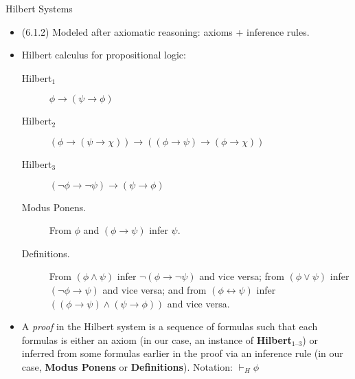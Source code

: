 \documentclass[../slides.tex]{subfiles}
\begin{document}
\begin{frame}{Hilbert Systems}

	\begin{itemize}
	
		\item (6.1.2) Modeled after axiomatic reasoning: axioms + inference rules.
	
		\item Hilbert calculus for propositional logic:
		
		 \begin{description}

						\item[Hilbert$_1$] $\phi\to (\psi\to \phi)$

						\item[Hilbert$_2$] $(\phi\to (\psi\to \chi))\to((\phi\to \psi)\to (\phi\to \chi))$

						\item[Hilbert$_3$] $(\neg \phi\to \neg \psi)\to (\psi\to\phi)$				
						
						\item[Modus Ponens.] From $\phi$ and $(\phi\to\psi)$ infer $\psi$.
						
						\item[Definitions.] From $(\phi\land\psi)$ infer $\neg(\phi\to\neg\psi)$ and vice versa; from $(\phi\lor\psi)$ infer  $(\neg\phi\to\psi)$ and vice versa; and from $(\phi\leftrightarrow\psi)$ infer $((\phi\to\psi)\land(\psi\to\phi))$ and vice versa.

		\end{description}
		
		\item A \emph{proof} in the Hilbert system is a sequence of formulas such that each formulas is either an axiom (in our case, an instance of \textbf{Hilbert}$_\text{1--3}$) or inferred from some formulas earlier in the proof via an inference rule (in our case, \textbf{Modus Ponens}  or \textbf{Definitions}). Notation: $\vdash_H\phi$
	
	\end{itemize}

\end{frame}
\end{document}
